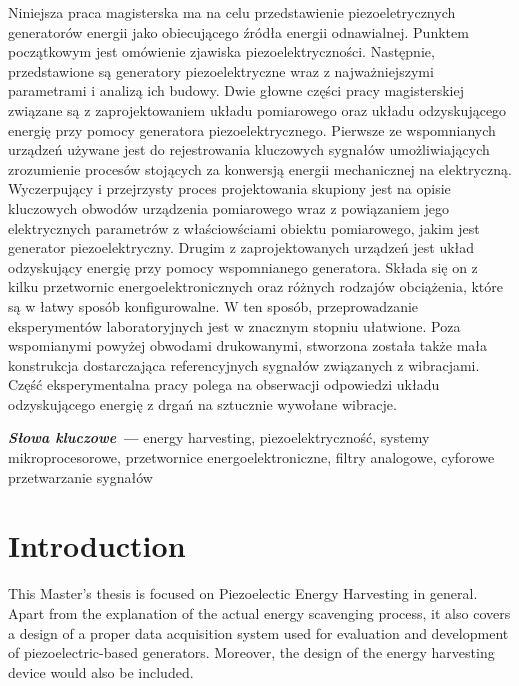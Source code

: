 \documentclass[12pt,a4paper]{article}
\providecommand{\slowakluczowe}[2]
{
  \small	
  \textbf{\textit{Słowa kluczowe ---}} #1
}
\begin{document}
Niniejsza praca magisterska ma na celu przedstawienie piezoeletrycznych generatorów energii jako obiecującego źródła energii odnawialnej. Punktem początkowym jest omówienie zjawiska piezoelektryczności. Następnie, przedstawione są generatory piezoelektryczne wraz z najważniejszymi parametrami i analizą ich budowy. Dwie głowne części pracy magisterskiej związane są z zaprojektowaniem układu pomiarowego oraz układu odzyskującego energię przy pomocy generatora piezoelektrycznego. Pierwsze ze wspomnianych urządzeń używane jest do rejestrowania kluczowych sygnałów umożliwiających zrozumienie procesów stojących za konwersją energii mechanicznej na elektryczną. Wyczerpujący i przejrzysty proces projektowania skupiony jest na opisie kluczowych obwodów urządzenia pomiarowego wraz z powiązaniem jego elektrycznych parametrów z właściowściami obiektu pomiarowego, jakim jest generator piezoelektryczny. Drugim z zaprojektowanych urządzeń jest układ odzyskujący energię przy pomocy wspomnianego generatora. Składa się on z kilku przetwornic energoelektronicznych oraz różnych rodzajów obciążenia, które są w łatwy sposób konfigurowalne. W ten sposób, przeprowadzanie eksperymentów laboratoryjnych jest w znacznym stopniu ułatwione. Poza wspomianymi powyżej obwodami drukowanymi, stworzona została także mała konstrukcja dostarczająca referencyjnych sygnałów związanych z wibracjami. Część eksperymentalna pracy polega na obserwacji odpowiedzi układu odzyskującego energię z drgań na sztucznie wywołane wibracje.

\par

\hspace{10pt}

\slowakluczowe{energy harvesting, piezoelektryczność, systemy mikroprocesorowe, przetwornice energoelektroniczne, filtry analogowe, cyforowe przetwarzanie sygnałów}


\clearpage
\newpage\null\thispagestyle{empty}\newpage
\tableofcontents
\clearpage

\section{Introduction}
This Master's thesis is focused on Piezoelectic Energy Harvesting in general. Apart from the explanation of the actual energy scavenging process, it also covers a design of a proper data acquisition system used for evaluation and development of piezoelectric-based generators. Moreover, the design of the energy harvesting device would also be included.
\par
\end{document}
